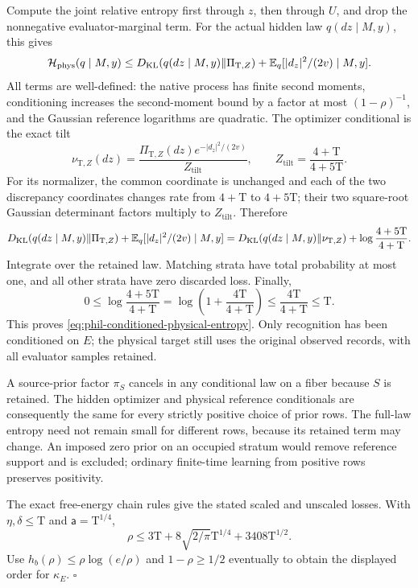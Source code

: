 Compute the joint relative entropy first through \(z\), then through
\(U\), and drop the nonnegative evaluator-marginal term. For the
actual hidden law \(q(dz\mid M,y)\), this gives
\[
 \mathcal H_{\mathrm{phys}}(q\mid M,y)
 \le D_{\mathrm{KL}}(q(dz\mid M,y)\Vert\Pi_{\mathrm T,Z})
             +\mathbb E_q[|d_z|^2/(2v)\mid M,y].
\]
All terms are well-defined: the native process has finite second
moments, conditioning increases the second-moment bound by a factor
at most \((1-\rho)^{-1}\), and the Gaussian reference logarithms are quadratic.
The optimizer conditional is the exact tilt
\[
 \nu_{\mathrm T,Z}(dz)
 =\frac{\Pi_{\mathrm T,Z}(dz)e^{-|d_z|^2/(2v)}}{Z_{\mathrm{tilt}}},
 \qquad
 Z_{\mathrm{tilt}}=\frac{4+\mathrm T}{4+5\mathrm T}.
\]
For its normalizer, the common coordinate is unchanged and each of
the two discrepancy coordinates changes rate from \(4+\mathrm T\)
to \(4+5\mathrm T\); their two square-root Gaussian determinant
factors multiply to \(Z_{\mathrm{tilt}}\). Therefore
\[
 D_{\mathrm{KL}}(q(dz\mid M,y)\Vert\Pi_{\mathrm T,Z})
       +\mathbb E_q[|d_z|^2/(2v)\mid M,y]
 =D_{\mathrm{KL}}(q(dz\mid M,y)\Vert\nu_{\mathrm T,Z})
                         +\log\frac{4+5\mathrm T}{4+\mathrm T}.
\]
Integrate over the retained law. Matching strata have total
probability at most one, and all other strata have zero discarded
loss. Finally,
\[
 0\le\log\frac{4+5\mathrm T}{4+\mathrm T}
 =\log\left(1+\frac{4\mathrm T}{4+\mathrm T}\right)
 \le\frac{4\mathrm T}{4+\mathrm T}\le\mathrm T.
\]
This proves \cref{eq:phil-conditioned-physical-entropy}.
Only recognition has been conditioned on \(E\); the physical target
still uses the original observed records, with all evaluator samples
retained.

A source-prior factor \(\pi_S\) cancels in any conditional law on a
fiber because \(S\) is retained. The hidden optimizer and physical
reference conditionals are consequently the same for every strictly
positive choice of prior rows. The full-law entropy need not remain
small for different rows, because its retained term may change.
An imposed zero prior on an occupied stratum would remove reference
support and is excluded; ordinary finite-time learning from positive
rows preserves positivity.

The exact free-energy chain rules give the stated scaled and unscaled
losses. With \(\eta,\delta\le\mathrm T\) and
\(\mathsf a=\mathrm T^{1/4}\),
\[
 \rho\le3\mathrm T+8\sqrt{2/\pi}\mathrm T^{1/4}
                         +3408\mathrm T^{1/2}.
\]
Use \(h_b(\rho)\le\rho\log(e/\rho)\) and
\(1-\rho\ge1/2\) eventually to obtain the displayed order for
\(\kappa_E\). \(\square\)

